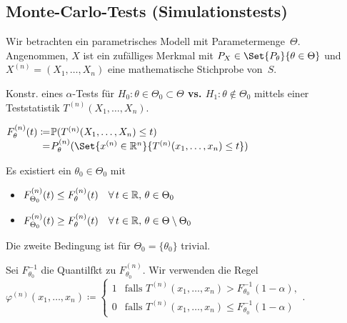 \documentclass{cheat-sheet}
\renewcommand{\P}{\mathbb{P}} %
\newcommand{\testh}[1]{\textcolor{TestColor}{\textbf{#1}}}
\begin{document}
\subsection{Monte-Carlo-Tests (Simulationstests)}

Wir betrachten ein parametrisches Modell mit Parametermenge~$\Theta$.
Angenommen, $X$ ist ein zufälliges Merkmal mit $P_X \in \Set{P_\theta}{\theta \in \Theta}$ und $X^{(n)} = (X_1, \ldots, X_n)$ eine mathematische Stichprobe von~$S$.

\begin{ziel}
  Konstr. eines $\alpha$-Tests für \testh{$H_0 : \theta \in \Theta_0 \subset \Theta$ vs. $H_1 : \theta \not\in \Theta_0$} mittels einer Teststatistik $T^{(n)}(X_1, \ldots, X_n)$.
\end{ziel}

\begin{nota}
  $
    \arraycolsep=0.4pt
    \begin{array}[t]{r l}
      F_\theta^{(n)} (t) \coloneqq & \P(T^{(n)}(X_1, \ldots, X_n) \leq t) \\
      = & P_\theta^{(n)}(\Set{x^{(n)} \in \R^n}{T^{(n)}(x_1, \ldots, x_n) \leq t})
    \end{array}
  $
\end{nota}

\begin{voraussetzung}
  Es existiert ein $\theta_0 \in \Theta_0$ mit \quad
  \begin{itemize}
    \item $F_{\Theta_0}^{(n)} (t) \leq F_\theta^{(n)} (t) \quad \forall \, t \in \mathbb{R}, \, \theta \in \Theta_0$
    \item $F_{\Theta_0}^{(n)} (t) \geq F_\theta^{(n)} (t) \quad \forall \, t \in \mathbb{R}, \, \theta \in \Theta \setminus \Theta_0$
  \end{itemize}
\end{voraussetzung}

\begin{bem}
  Die zweite Bedingung ist für $\Theta_0 = \{ \theta_0 \}$ trivial.
\end{bem}

\begin{test}
  Sei $F_{\theta_0}^{-1}$ die Quantilfkt zu $F^{(n)}_{\theta_0}$.
  Wir verwenden die Regel
  $
    \varphi^{(n)} (x_1, \ldots, x_n) \coloneqq \begin{cases}
      1 & \text{falls } T^{(n)} (x_1, \ldots, x_n) > F_{\theta_0}^{-1}(1-\alpha), \\
      0 & \text{falls } T^{(n)} (x_1, \ldots, x_n) \leq F_{\theta_0}^{-1}(1-\alpha)
    \end{cases}.
  $
\end{test}
\end{document}
